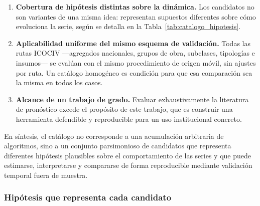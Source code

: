 \documentclass[12pt,letterpaper]{article}
\newcommand{\ICOCIV}{ICOCIV}
\begin{document}
\begin{enumerate}[leftmargin=*,label=\textbf{\arabic*.}]
    \item \textbf{Cobertura de hipótesis distintas sobre la dinámica.} Los candidatos no son variantes de una misma idea: representan supuestos diferentes sobre cómo evoluciona la serie, según se detalla en la Tabla~\ref{tab:catalogo_hipotesis}.
    \item \textbf{Aplicabilidad uniforme del mismo esquema de validación.} Todas las rutas \ICOCIV{} ---agregados nacionales, grupos de obra, subclases, tipologías e insumos--- se evalúan con el mismo procedimiento de origen móvil, sin ajustes por ruta. Un catálogo homogéneo es condición para que esa comparación sea la misma en todos los casos.
    \item \textbf{Alcance de un trabajo de grado.} Evaluar exhaustivamente la literatura de pronóstico excede el propósito de este trabajo, que es construir una herramienta defendible y reproducible para un uso institucional concreto.
\end{enumerate}

En síntesis, el catálogo no corresponde a una acumulación arbitraria de algoritmos, sino a un conjunto parsimonioso de candidatos que representa diferentes hipótesis plausibles sobre el comportamiento de las series y que puede estimarse, interpretarse y compararse de forma reproducible mediante validación temporal fuera de muestra.

\subsubsection*{Hipótesis que representa cada candidato}
\end{document}
